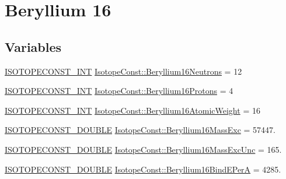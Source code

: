 \hypertarget{group___isotope_const-_beryllium-_be16}{}\section{Beryllium 16}
\label{group___isotope_const-_beryllium-_be16}
\subsection*{Variables}
\begin{DoxyCompactItemize}
\item 
\mbox{\hyperlink{group___isotope_const-_macros_ga5f18360b3e99483a35c32d789e62621c}{I\+S\+O\+T\+O\+P\+E\+C\+O\+N\+S\+T\+\_\+\+I\+NT}} \mbox{\hyperlink{group___isotope_const-_beryllium-_be16_ga96303901bbc4c1520a15112aef28a69b}{Isotope\+Const\+::\+Beryllium16\+Neutrons}} = 12
\item 
\mbox{\hyperlink{group___isotope_const-_macros_ga5f18360b3e99483a35c32d789e62621c}{I\+S\+O\+T\+O\+P\+E\+C\+O\+N\+S\+T\+\_\+\+I\+NT}} \mbox{\hyperlink{group___isotope_const-_beryllium-_be16_ga5021d23e3152fedc707384019f979b56}{Isotope\+Const\+::\+Beryllium16\+Protons}} = 4
\item 
\mbox{\hyperlink{group___isotope_const-_macros_ga5f18360b3e99483a35c32d789e62621c}{I\+S\+O\+T\+O\+P\+E\+C\+O\+N\+S\+T\+\_\+\+I\+NT}} \mbox{\hyperlink{group___isotope_const-_beryllium-_be16_ga5fb9d717613b6d18b96bbb2c70bc51c5}{Isotope\+Const\+::\+Beryllium16\+Atomic\+Weight}} = 16
\item 
\mbox{\hyperlink{group___isotope_const-_macros_ga8f45a7272ce02c0b4c65c44636ed719a}{I\+S\+O\+T\+O\+P\+E\+C\+O\+N\+S\+T\+\_\+\+D\+O\+U\+B\+LE}} \mbox{\hyperlink{group___isotope_const-_beryllium-_be16_ga3f4948faa5d4d55f3cbe041713c008b4}{Isotope\+Const\+::\+Beryllium16\+Mass\+Exc}} = 57447.
\item 
\mbox{\hyperlink{group___isotope_const-_macros_ga8f45a7272ce02c0b4c65c44636ed719a}{I\+S\+O\+T\+O\+P\+E\+C\+O\+N\+S\+T\+\_\+\+D\+O\+U\+B\+LE}} \mbox{\hyperlink{group___isotope_const-_beryllium-_be16_ga1f7992b858dc8ebbddbf3b5f74c151e6}{Isotope\+Const\+::\+Beryllium16\+Mass\+Exc\+Unc}} = 165.
\item 
\mbox{\hyperlink{group___isotope_const-_macros_ga8f45a7272ce02c0b4c65c44636ed719a}{I\+S\+O\+T\+O\+P\+E\+C\+O\+N\+S\+T\+\_\+\+D\+O\+U\+B\+LE}} \mbox{\hyperlink{group___isotope_const-_beryllium-_be16_ga65d47a17d8a2dc97287daad769a3f2a8}{Isotope\+Const\+::\+Beryllium16\+Bind\+E\+PerA}} = 4285.
\item 

\end{DoxyCompactItemize}

